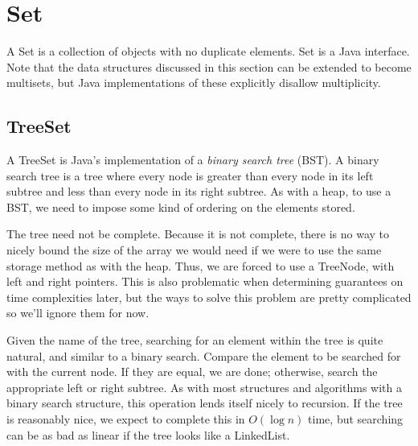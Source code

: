 \documentclass[11pt]{book}
\begin{document}
\section{Set}

A Set is a collection of objects with no duplicate elements. Set is a Java interface. Note that the data structures discussed in this section can be extended to become multisets, but Java implementations of these explicitly disallow multiplicity.

\subsection{TreeSet}

A TreeSet is Java's implementation of a \textit{binary search tree} (BST). A binary search tree is a tree where every node is greater than every node in its left subtree and less than every node in its right subtree. As with a heap, to use a BST, we need to impose some kind of ordering on the elements stored.

\begin{center}
\end{center}

The tree need not be complete. Because it is not complete, there is no way to nicely bound the size of the array we would need if we were to use the same storage method as with the heap. Thus, we are forced to use a TreeNode, with left and right pointers. This is also problematic when determining guarantees on time complexities later, but the ways to solve this problem are pretty complicated so we'll ignore them for now.

Given the name of the tree, searching for an element within the tree is quite natural, and similar to a binary search. Compare the element to be searched for with the current node. If they are equal, we are done; otherwise, search the appropriate left or right subtree. As with most structures and algorithms with a binary search structure, this operation lends itself nicely to recursion. If the tree is reasonably nice, we expect to complete this in $O(\log{n})$ time, but searching can be as bad as linear if the tree looks like a LinkedList.
\end{document}
